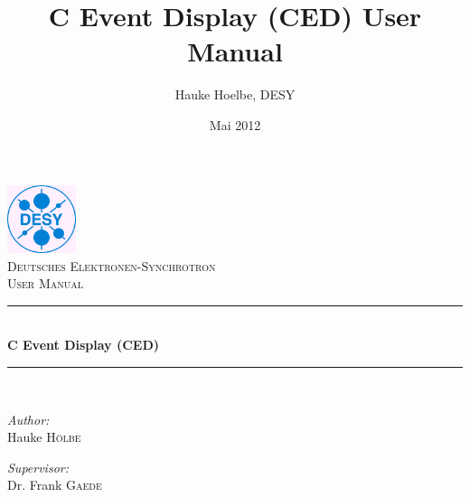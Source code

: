 \documentclass[a4paper,10pt]{article}
\title{C Event Display (CED) User Manual}
\author{Hauke Hoelbe, DESY}
\date{Mai 2012}
\newcommand{\HRule}{\rule{\linewidth}{0.5mm}}
\begin{document}


\begin{titlepage}
\begin{center}
    \includegraphics[width=0.15\textwidth]{./desylogo.png}\\[1cm]    
    
    \textsc{\LARGE Deutsches Elektronen-Synchrotron }\\[1.5cm]
    
    \textsc{\Large User Manual}\\[0.5cm]
    
    
    \HRule \\[0.4cm]
    { \huge \bfseries C Event Display (CED)}\\[0.4cm]
    
    \HRule \\[1.5cm]
    
    \begin{minipage}{0.4\textwidth}
    \begin{flushleft} \large
    \emph{Author:}\\
    Hauke  \textsc{H\"olbe}
    \end{flushleft}
    \end{minipage}
    \begin{minipage}{0.4\textwidth}
    \begin{flushright} \large
    \emph{Supervisor:} \\
    Dr. Frank \textsc{Gaede}
    \end{flushright}
    \end{minipage}
    

\end{center}
\end{titlepage}
\end{document}
